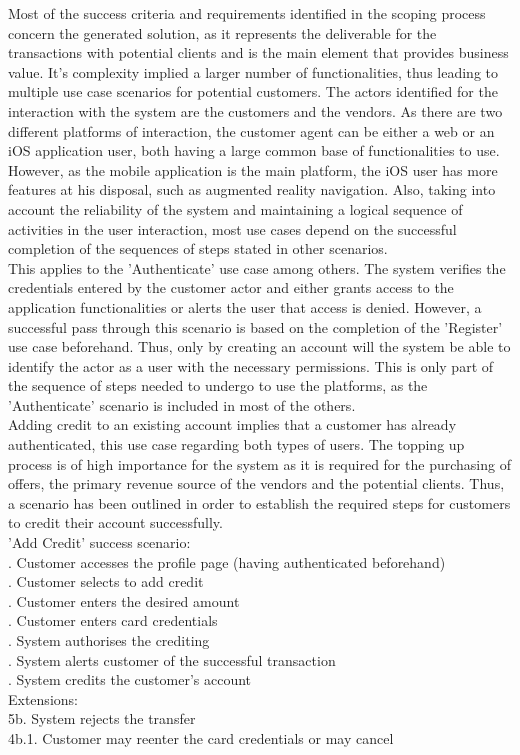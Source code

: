 Most of the success criteria and requirements identified in the scoping process concern the generated solution, as it represents the deliverable for the transactions with potential clients and is the main element that provides business value. It's complexity implied a larger number of functionalities, thus leading to multiple use case scenarios for potential customers. The actors identified for the interaction with the system are the customers and the vendors. As there are two different platforms of interaction, the customer agent can be either a web or an iOS application user, both having a large common base of functionalities to use. However, as the mobile application is the main platform, the iOS user has more features at his disposal, such as augmented reality navigation. Also, taking into account the reliability of the system and maintaining a logical sequence of activities in the user interaction, most use cases depend on the successful completion of the sequences of steps stated in other scenarios.\\

This applies to the 'Authenticate' use case among others. The system verifies the credentials entered by the customer actor and either grants access to the application functionalities or alerts the user that access is denied. However, a successful pass through this scenario is based on the completion of the 'Register' use case beforehand. Thus, only by creating an account will the system be able to identify the actor as a user with the necessary permissions. This is only part of the sequence of steps needed to undergo to use the platforms, as the 'Authenticate' scenario is included in most of the others.\\

Adding credit to an existing account implies that a customer has already authenticated, this use case regarding both types of users. The topping up process is of high importance for the system as it is required for the purchasing of offers, the primary revenue source of the vendors and the potential clients. Thus, a scenario has been outlined in order to establish the required steps for customers to credit their account successfully.\\

\noindent 'Add Credit' success scenario:\\
. Customer accesses the profile page (having authenticated beforehand)\\
. Customer selects to add credit\\
. Customer enters the desired amount\\
. Customer enters card credentials\\
. System authorises the crediting\\
. System alerts customer of the successful transaction\\
. System credits the customer's account\\
Extensions:\\
\indent 5b. System rejects the transfer\\
\indent\indent 4b.1. Customer may reenter the card credentials or may cancel\\

